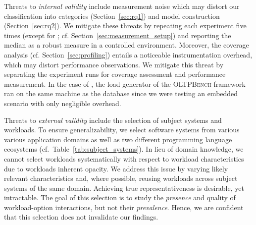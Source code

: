 {{Threats to \textit{internal validity} include measurement noise which may distort our classification into categories (Section~\ref{sec:rq1}) and model construction (Section~\ref{sec:rq2}). We mitigate these threats by repeating each experiment five times  (except for \htwo; cf. Section~\ref{sec:measurement_setup}) and reporting the median as a robust measure in a controlled environment. Moreover, the coverage analysis (cf. Section~\ref{sec:profiling}) entails a noticeable instrumentation overhead, which may distort performance observations. We mitigate this threat by separating the experiment runs for coverage assessment and performance measurement. In the case of \htwo, the load generator of the \textsc{OLTPBench} framework~\cite{difallah_oltp_2013} ran on the same machine as the database since we were testing an embedded scenario with only negligible overhead. 	
	
Threats to\textit{ external validity} include the selection of subject systems and workloads. To ensure generalizability, we select software systems from various various application domains as well as two different programming language ecosystems (cf.~Table~\ref{tab:subject_systems}). In lieu of domain knowledge, we cannot select workloads systematically with respect to workload characteristics due to workloads inherent opacity. We address this issue by varying likely relevant characteristics and, where possible, reusing workloads across subject systems of the same domain. Achieving true representativeness is desirable, yet intractable. 
The goal of this selection is to study the \emph{presence} and quality of workload-option interactions, but not their \emph{prevalence}. Hence, we are confident that this selection does not invalidate our findings.

}
}
